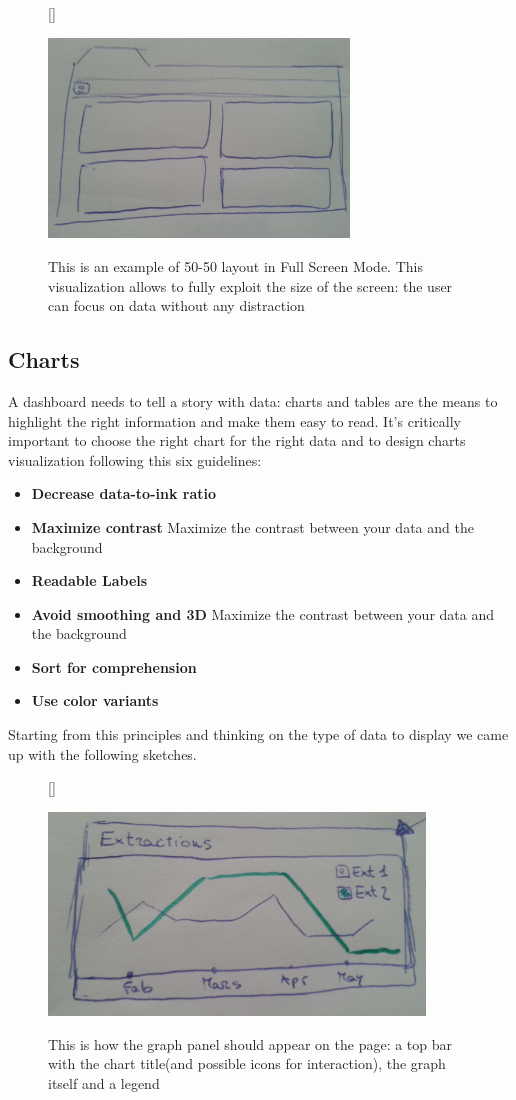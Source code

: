 \documentclass[a4paper,13pt]{report}
\begin{document}
\begin{figure}[H]
[\FBwidth]
{\caption{This is an example of 50-50 layout in Full Screen Mode. This visualization allows to fully exploit the size of the screen: the user can focus on data without any distraction}\label{fig:test}}
{\includegraphics[width=8cm]{pics/UISketches/desk4}}
\end{figure}


\subsection{ Charts }
A dashboard needs to tell a story with data: charts and 
tables are the means to highlight the right information and make them easy to read. It's critically important to choose the right chart for the right data and to design charts visualization following this six guidelines:
\begin{itemize}
\item \textbf{Decrease data-to-ink ratio } 
\item \textbf{Maximize contrast }  Maximize the contrast between your data and the background
\item \textbf{Readable Labels } 
\item \textbf{Avoid smoothing and 3D }  Maximize the contrast between your data and the background
\item \textbf{Sort for comprehension }
\item \textbf{Use color variants }  
\end{itemize}
Starting from this principles and thinking on the type of data to display we came up with the following sketches.

\begin{figure}[H]
[\FBwidth]
{\caption{This is how the graph panel should appear on the page: a top bar with the chart title(and possible icons for interaction), the graph itself and a legend}\label{fig:test}}
{\includegraphics[width=10cm]{pics/UISketches/chart0}}
\end{figure}
\end{document}

